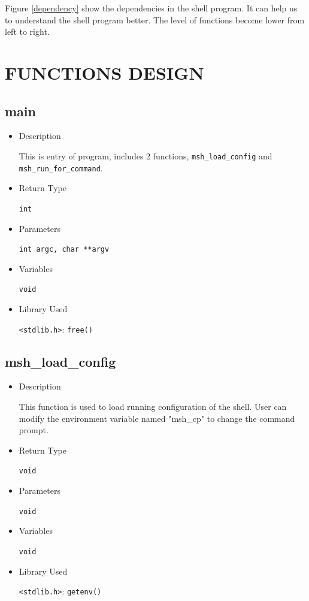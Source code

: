 \documentclass{article}
\begin{document}
Figure \ref{dependency} show the dependencies in the shell program.
It can help us to understand the shell program better.
The level of functions become lower from left to right.

\newpage
\section{FUNCTIONS DESIGN}
\subsection{main}
\begin{itemize}
\item Description

This is entry of program, includes 2 functions, \verb|msh_load_config| and \verb|msh_run_for_command|.

\item Return Type

\verb|int|

\item Parameters

\verb|int argc, char **argv|

\item Variables

\verb|void|

\item Library Used

\verb|<stdlib.h>|: \verb|free()|
\end{itemize}

\subsection{msh\_load\_config}
\begin{itemize}
\item Description

This function is used to load running configuration of the shell.
User can modify the environment variable named "msh\_cp" to change the command prompt.

\item Return Type

\verb|void|

\item Parameters

\verb|void|

\item Variables

\verb|void|

\item Library Used

\verb|<stdlib.h>|: \verb|getenv()|
\end{itemize}
\end{document}
